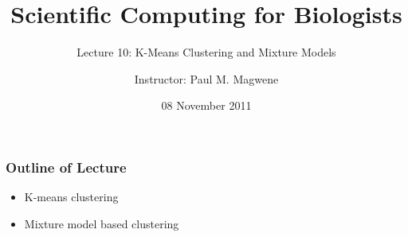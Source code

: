 \documentclass{beamer}
\title{Scientific Computing for Biologists}
\subtitle{Lecture 10: K-Means Clustering and Mixture Models} %
\author{Instructor: Paul M. Magwene}
\date{08 November 2011}
\begin{document}
\begin{frame}
\titlepage
\end{frame}



\begin{frame}
  \frametitle{Outline of Lecture}

\begin{itemize}
    \item K-means clustering    
    \item Mixture model based clustering
\end{itemize}    

\end{frame}



\end{document}
